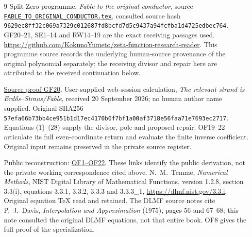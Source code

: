 \documentclass[11pt]{article}
\begin{document}
\begin{thebibliography}{9}
 Split-Zero programme, \emph{Fable to the original
conductor}, source \href{https://github.com/KokunoYumeto/zeta-function-research-reader/blob/5992ad50c0f2a06921f1fcaded7b4e38097c0739/workbenches/splitzero-tandem/continuations/20260920-original-kernel-mixed-determinants/providers/FABLE_TO_ORIGINAL_CONDUCTOR.tex\#L1}{\texttt{FABLE\_TO\_ORIGINAL\_CONDUCTOR.tex}},
consulted source hash
\nolinkurl{9629ec8ff32c069a7329c012687fd8bcfd7d5c9437a94fcfba1d4725edbec764}.
GF20--21, SE1--14 and RW14--19 are the exact receiving passages used.
\url{https://github.com/KokunoYumeto/zeta-function-research-reader}.
This programme source records the underlying human-source provenance
of the original polynomial separately; the receiving divisor and
repair here are attributed to the received continuation below.

\href{https://github.com/KokunoYumeto/zeta-function-research-reader/blob/5992ad50c0f2a06921f1fcaded7b4e38097c0739/workbenches/splitzero-tandem/continuations/20260920-original-kernel-mixed-determinants/providers/FABLE_TO_ORIGINAL_CONDUCTOR.tex\#L1598}{Source proof GF20}.
 User-supplied web-session calculation,
\emph{The relevant strand is Erd\H{o}s--Straus/Fable},
received 20 September 2026; no human author name supplied.
Original SHA256
\nolinkurl{57efa66b73bb4ce951b1d17ec4170b0f7bf1a00af3718e56faa71e7693ec2717}.
Equations (1)--(28) supply the divisor, pole and proposed repair;
OF19--22 articulate its full even-coordinate return and evaluate
the finite inverse coefficient. Original input remains preserved
in the private source register.

Public reconstruction: \href{https://github.com/KokunoYumeto/zeta-function-research-reader/blob/689a8f87e9c12b7a99b01b3123438c6751ee608f/workbenches/splitzero-tandem/continuations/20260920-native-secular-frame/ODD_FRAME_REPAIR.tex\#L38}{OF1--OF22}. These links identify the public derivation, not the private working correspondence cited above.
 N.~M.~Temme, \emph{Numerical Methods}, NIST Digital
Library of Mathematical Functions, version 1.2.8, section 3.3(i),
equations 3.3.1, 3.3.2, 3.3.3 and 3.3.3\_1,
\url{https://dlmf.nist.gov/3.3.i}.
Original equation TeX read and retained. The DLMF source notes cite
P.~J.~Davis, \emph{Interpolation and Approximation} (1975),
pages 56 and 67--68; this note consulted the original DLMF equations,
not that entire book. OF8 gives the full proof of the specialization.
\end{thebibliography}
\end{document}
